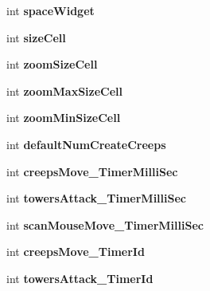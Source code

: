 \begin{DoxyCompactItemize}
\item 
\hypertarget{class_game_widget_a99ff2a3937f870dd19982e0ab7b1092c}{}int {\bfseries space\+Widget}\label{class_game_widget_a99ff2a3937f870dd19982e0ab7b1092c}

\item 
\hypertarget{class_game_widget_a35051c38a364abbde2e3d0e647a1d3a6}{}int {\bfseries size\+Cell}\label{class_game_widget_a35051c38a364abbde2e3d0e647a1d3a6}

\item 
\hypertarget{class_game_widget_a232af74a13a9edc462eb820bde5468c0}{}int {\bfseries zoom\+Size\+Cell}\label{class_game_widget_a232af74a13a9edc462eb820bde5468c0}

\item 
\hypertarget{class_game_widget_ac41eb5558a340fff5b49c6802e7357a4}{}int {\bfseries zoom\+Max\+Size\+Cell}\label{class_game_widget_ac41eb5558a340fff5b49c6802e7357a4}

\item 
\hypertarget{class_game_widget_a757f06a394392e54df1b5ac1515bbe27}{}int {\bfseries zoom\+Min\+Size\+Cell}\label{class_game_widget_a757f06a394392e54df1b5ac1515bbe27}

\item 
\hypertarget{class_game_widget_a31b4a58012bd407d145d4639c1c44c07}{}int {\bfseries default\+Num\+Create\+Creeps}\label{class_game_widget_a31b4a58012bd407d145d4639c1c44c07}

\item 
\hypertarget{class_game_widget_a9acf1480652303062b8c13e11b7c981d}{}int {\bfseries creeps\+Move\+\_\+\+Timer\+Milli\+Sec}\label{class_game_widget_a9acf1480652303062b8c13e11b7c981d}

\item 
\hypertarget{class_game_widget_acec513f65a85f9d35346cbe0350f3001}{}int {\bfseries towers\+Attack\+\_\+\+Timer\+Milli\+Sec}\label{class_game_widget_acec513f65a85f9d35346cbe0350f3001}

\item 
\hypertarget{class_game_widget_ac8c0d1730ae9fadd2c6f6a5bff57989d}{}int {\bfseries scan\+Mouse\+Move\+\_\+\+Timer\+Milli\+Sec}\label{class_game_widget_ac8c0d1730ae9fadd2c6f6a5bff57989d}

\item 
\hypertarget{class_game_widget_a88c68f376a32a77b2f303e395b455cab}{}int {\bfseries creeps\+Move\+\_\+\+Timer\+Id}\label{class_game_widget_a88c68f376a32a77b2f303e395b455cab}

\item 
\hypertarget{class_game_widget_a45e9bdcd871af004a3c20f33ea85a4ed}{}int {\bfseries towers\+Attack\+\_\+\+Timer\+Id}\label{class_game_widget_a45e9bdcd871af004a3c20f33ea85a4ed}


\end{DoxyCompactItemize}
